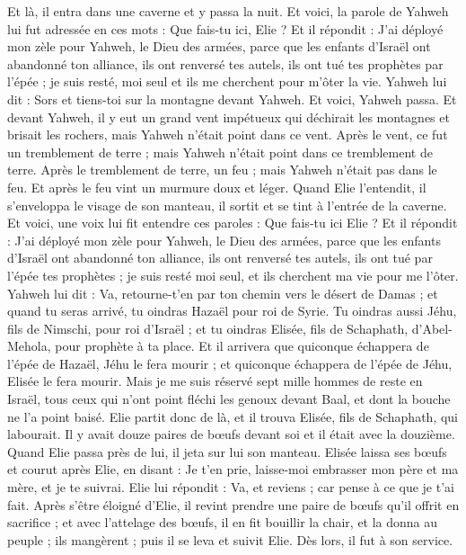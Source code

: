 \begin{multicols}{2}
Et là, il entra dans une caverne et y passa la nuit. Et voici, la parole de Yahweh lui fut adressée en ces mots : Que fais-tu ici, Elie ?
Et il répondit : J'ai déployé mon zèle pour Yahweh, le Dieu des armées, parce que les enfants d'Israël ont abandonné ton alliance, ils ont renversé tes autels, ils ont tué tes prophètes par l'épée ; je suis resté, moi seul et ils me cherchent pour m'ôter la vie.
Yahweh lui dit : Sors et tiens-toi sur la montagne devant Yahweh. Et voici, Yahweh passa. Et devant Yahweh, il y eut un grand vent impétueux qui déchirait les montagnes et brisait les rochers, mais Yahweh n'était point dans ce vent. Après le vent, ce fut un tremblement de terre ; mais Yahweh n'était point dans ce tremblement de terre.
Après le tremblement de terre, un feu ; mais Yahweh n'était pas dans le feu. Et après le feu vint un murmure doux et léger.
Quand Elie l'entendit, il s’enveloppa le visage de son manteau, il sortit et se tint à l'entrée de la caverne. Et voici, une voix lui fit entendre ces paroles : Que fais-tu ici Elie ?
Et il répondit : J'ai déployé mon zèle pour Yahweh, le Dieu des armées, parce que les enfants d'Israël ont abandonné ton alliance, ils ont renversé tes autels, ils ont tué par l'épée tes prophètes ; je suis resté moi seul, et ils cherchent ma vie pour me l'ôter.
Yahweh lui dit : Va, retourne-t'en par ton chemin vers le désert de Damas ; et quand tu seras arrivé, tu oindras Hazaël pour roi de Syrie.
Tu oindras aussi Jéhu, fils de Nimschi, pour roi d’Israël ; et tu oindras Elisée, fils de Schaphath, d'Abel-Mehola, pour prophète à ta place.
Et il arrivera que quiconque échappera de l'épée de Hazaël, Jéhu le fera mourir ; et quiconque échappera de l'épée de Jéhu, Elisée le fera mourir.
Mais je me suis réservé sept mille hommes de reste en Israël, tous ceux qui n'ont point fléchi les genoux devant Baal, et dont la bouche ne l'a point baisé.
Elie partit donc de là, et il trouva Elisée, fils de Schaphath, qui labourait. Il y avait douze paires de bœufs devant soi et il était avec la douzième. Quand Elie passa près de lui, il jeta sur lui son manteau.
Elisée laissa ses bœufs et courut après Elie, en disant : Je t’en prie, laisse-moi embrasser mon père et ma mère, et je te suivrai. Elie lui répondit : Va, et reviens ; car pense à ce que je t'ai fait.
Après s’être éloigné d’Elie, il revint prendre une paire de bœufs qu’il offrit en sacrifice ; et avec l'attelage des bœufs, il en fit bouillir la chair, et la donna au peuple ; ils mangèrent ; puis il se leva et suivit Elie. Dès lors, il fut à son service.

\end{multicols}
